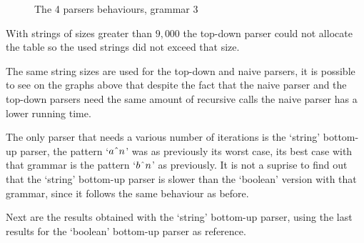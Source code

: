 \begin{figure}[h]
\caption{The 4 parsers behaviours, grammar 3}
\end{figure}
\FloatBarrier

With strings of sizes greater than $9,000$ the top-down parser could not allocate the table so the used strings did not exceed that size.

The same string sizes are used for the top-down and naive parsers, it is possible to see on the graphs above that despite the fact that the naive parser and the top-down parsers need the same amount of recursive calls the naive parser has a lower running time.

The only parser that needs a various number of iterations is the `string' bottom-up parser, the pattern `$a\string^ n$' was as previously its worst case, its best case with that grammar is the pattern `$b\string^ n$' as previously.
It is not a suprise to find out that the `string' bottom-up parser is slower than the `boolean' version with that grammar, since it follows the same behaviour as before.

Next are the results obtained with the `string' bottom-up parser, using the last results for the `boolean' bottom-up parser as reference.

